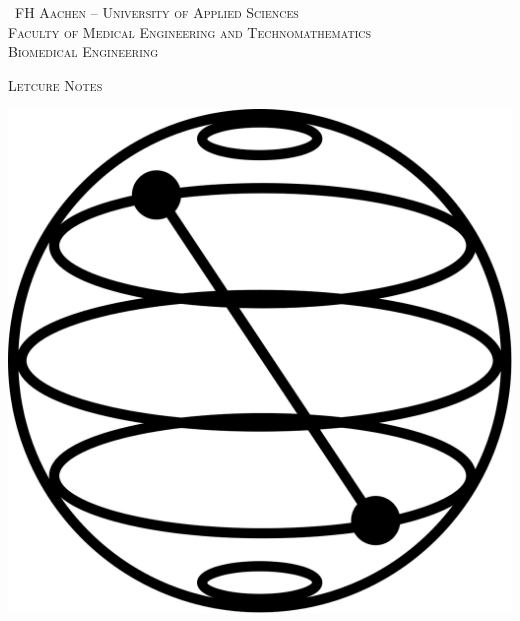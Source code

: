 \begin{titlepage}
	\centering
	{\scshape\ FH Aachen – University of Applied Sciences\\
Faculty of Medical Engineering and
Technomathematics \\
Biomedical Engineering\\ \par}
	\vspace{1cm}
	{\scshape\Large Letcure Notes\par}
	\vspace{1.5cm}
	{\includegraphics[scale = 0.15]{1200px-Qiskit-Logo.svg.png}\par}

\end{titlepage}
